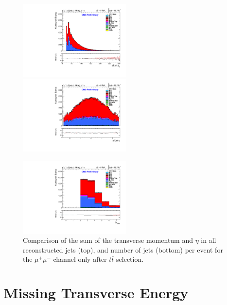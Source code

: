 \begin{figure}
\includegraphics[width=0.5\textwidth]{Plots/ControlPlots/TTbarDiLeptonAnalysis/MuMu/Jets/all_jet_pT_splitTTbar_ratio.pdf}
\includegraphics[width=0.5\textwidth]{Plots/ControlPlots/TTbarDiLeptonAnalysis/MuMu/Jets/all_jet_eta_splitTTbar_ratio.pdf}\\
\begin{center}
\includegraphics[width=0.5\textwidth]{Plots/ControlPlots/TTbarDiLeptonAnalysis/MuMu/Jets/N_Jets_splitTTbar_ratio.pdf}
\end{center}
\caption{Comparison of the sum of the transverse momentum and $\eta$ in all reconstructed jets (top), and number of jets (bottom) per event for the $\mu^{+}\mu^{-}$ channel only after $t\bar{t}$ selection.}
\label{fig-jetPlots}
\end{figure}
 
\section{Missing Transverse Energy} \label{sec-METSelection}


